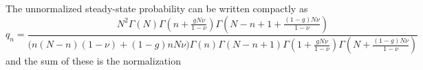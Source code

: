 The unnormalized steady-state probability can be written compactly as%
\begin{equation*}%
q_n = \frac{ N^2\Gamma(N) \Gamma\left(n+\frac{g N\nu}{1-\nu}\right) \Gamma\left(N-n+1+\frac{(1-g) N\nu}{1-\nu}\right) }{ \big(n(N-n)(1-\nu)+(1-g)n N\nu\big) \Gamma(n) \Gamma(N-n+1) \Gamma\left(1+\frac{g N\nu}{1-\nu}\right) \Gamma\left(N+\frac{(1-g) N\nu}{1-\nu}\right)}
\end{equation*}
and the sum of these is the normalization
